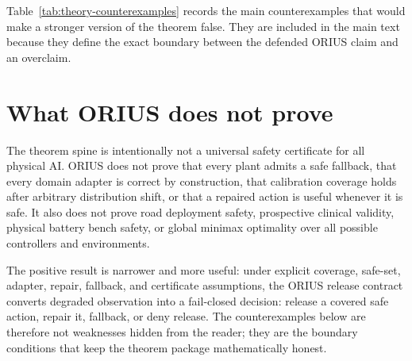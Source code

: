 Table~\ref{tab:theory-counterexamples} records the main counterexamples that
would make a stronger version of the theorem false. They are included in the
main text because they define the exact boundary between the defended ORIUS
claim and an overclaim.

\section{What ORIUS does not prove}
The theorem spine is intentionally not a universal safety certificate for all
physical AI. ORIUS does not prove that every plant admits a safe fallback, that
every domain adapter is correct by construction, that calibration coverage
holds after arbitrary distribution shift, or that a repaired action is useful
whenever it is safe. It also does not prove road deployment safety, prospective
clinical validity, physical battery bench safety, or global minimax optimality
over all possible controllers and environments.

The positive result is narrower and more useful: under explicit coverage,
safe-set, adapter, repair, fallback, and certificate assumptions, the ORIUS
release contract converts degraded observation into a fail-closed decision:
release a covered safe action, repair it, fallback, or deny release. The
counterexamples below are therefore not weaknesses hidden from the reader; they
are the boundary conditions that keep the theorem package mathematically honest.

\begin{table}[htbp]
\centering
\scriptsize
\caption{Counterexamples and assumption boundaries for the observation-ambiguity theorem.}
\label{tab:theory-counterexamples}
\end{table}

